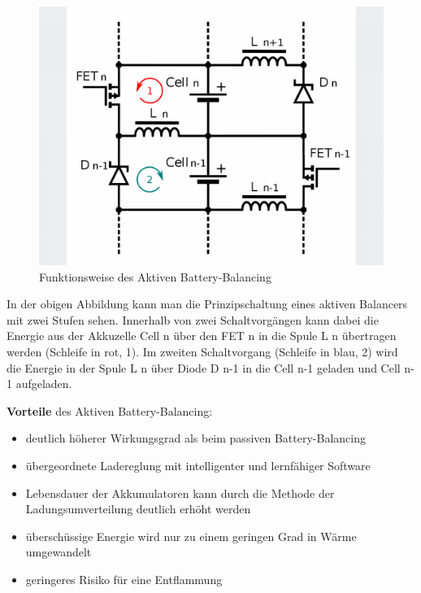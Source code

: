 \begin{figure}[H]
	\begin{center}
		\includegraphics[scale=0.35]{figures/Akku/Aktives Balancing.png}
		\caption{Funktionsweise des Aktiven Battery-Balancing\cite{FunktionsweiseAktivBalancing}}
		\label{fig: Funktionsweise des Aktiven Battery-Balancing}
	\end{center}
\end{figure}

In der obigen Abbildung kann man die Prinzipschaltung eines aktiven Balancers mit zwei Stufen sehen. Innerhalb von zwei Schaltvorgängen kann dabei die Energie aus der Akkuzelle Cell n über den FET n in die Spule L n übertragen werden (Schleife in rot, 1).
Im zweiten Schaltvorgang (Schleife in blau, 2) wird die Energie in der Spule L n über Diode D n-1 in die Cell n-1 geladen und Cell n-1 aufgeladen.

\textbf{Vorteile} des Aktiven Battery-Balancing:
\begin{itemize}
\item {deutlich höherer Wirkungsgrad als beim passiven Battery-Balancing} \medskip\\
\item {übergeordnete Ladereglung mit intelligenter und lernfähiger Software} \medskip\\
\item {Lebensdauer der Akkumulatoren kann durch die Methode der Ladungsumverteilung deutlich erhöht werden} \medskip\\
\item {überschüssige Energie wird nur zu einem geringen Grad in Wärme umgewandelt} \medskip\\
\item {geringeres Risiko für eine Entflammung} \medskip\\
\end{itemize}

